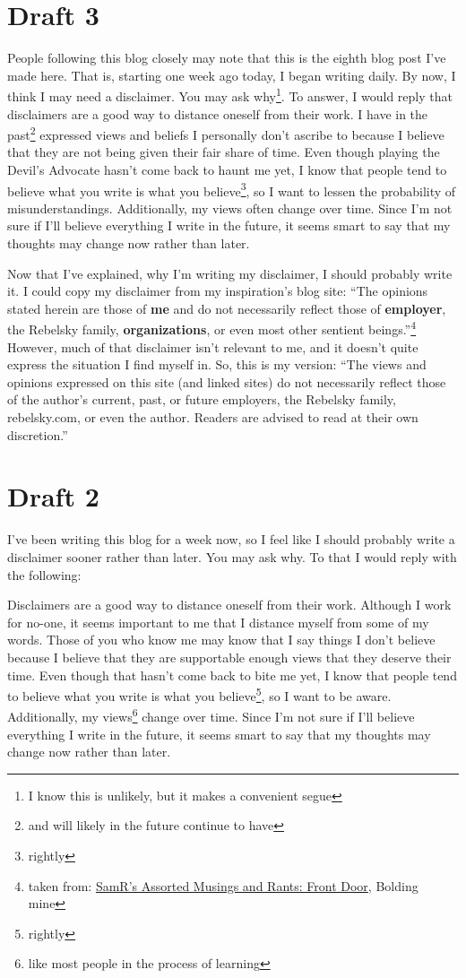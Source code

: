 \documentclass[12pt]{article}[titlepage]
\newcommand{\say}[1]{``#1''}
\newcommand{\1}{\={a}}
\newcommand{\2}{\={e}}
\newcommand{\3}{\={\i}}
\newcommand{\4}{\=o}
\newcommand{\5}{\=u}
\newcommand{\6}{\={A}}
\renewcommand{\,}{\textsuperscript{,}}
\begin{document}
\section{Draft 3}
People following this blog closely may note that this is the eighth blog post I've made here.
That is, starting one week ago today, I began writing daily.
By now, I think I may need a disclaimer.
You may ask why\footnote{I know this is unlikely, but it makes a convenient segue}.
To answer, I would reply that disclaimers are a good way to distance oneself from their work.
I have in the past\footnote{and will likely in the future continue to have} expressed views and beliefs I personally don't ascribe to because I believe that they are not being given their fair share of time.
Even though playing the Devil's Advocate hasn't come back to haunt me yet, I know that people tend to believe what you write is what you believe\footnote{rightly}, so I want to lessen the probability of misunderstandings.
Additionally, my views often change over time.
Since I'm not sure if I'll believe everything I write in the future, it seems smart to say that my thoughts may change now rather than later.

Now that I've explained, why I'm writing my disclaimer, I should probably write it.
I could copy my disclaimer from my inspiration's blog site: \say{The opinions stated herein are those of \textbf{me} and do not necessarily reflect those of \textbf{employer}, the Rebelsky family, \textbf{organizations}, or even most other sentient beings.}\footnote{taken from: \href{http://www.cs.grinnell.edu/~rebelsky/musings/}{SamR's Assorted Musings and Rants: Front Door}, Bolding mine}
However, much of that disclaimer isn't relevant to me, and it doesn't quite express the situation I find myself in.
So, this is my version: \say{The views and opinions expressed on this site (and linked sites) do not necessarily reflect those of the author's current, past, or future employers, the Rebelsky family, rebelsky.com, or even the author.
Readers are advised to read at their own discretion.}

\section{Draft 2}
I've been writing this blog for a week now, so I feel like I should probably write a disclaimer sooner rather than later.
You may ask why.
To that I would reply with the following:

Disclaimers are a good way to distance oneself from their work.
Although I work for no-one, it seems important to me that I distance myself from some of my words.
Those of you who know me may know that I say things I don't believe because I believe that they are supportable enough views that they deserve their time.
Even though that hasn't come back to bite me yet, I know that people tend to believe what you write is what you believe\footnote{rightly}, so I want to be aware.
Additionally, my views\footnote{like most people in the process of learning} change over time.
Since I'm not sure if I'll believe everything I write in the future, it seems smart to say that my thoughts may change now rather than later.
\end{document}
